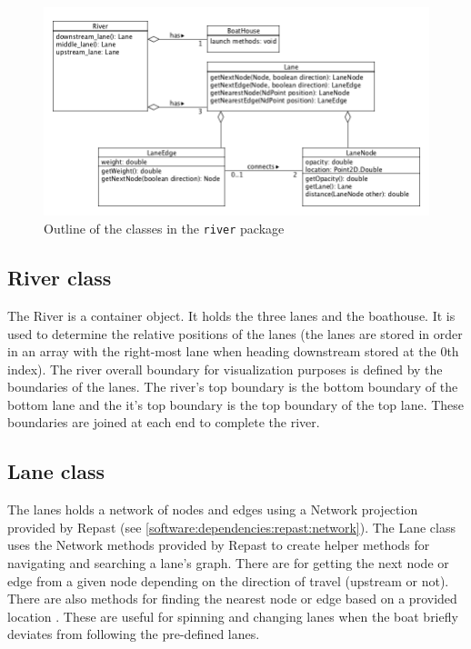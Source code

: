 \begin{figure}
\begin{center}
  \includegraphics[scale=0.3]{images/riverpackage.png}
  \caption{Outline of the classes in the \texttt{river} package}
  \label{software:fig:riverUML}
\end{center}
\end{figure}

\subsection{River class}
The River is a container object. It holds the three lanes and the
boathouse. It is used to determine the relative positions of the lanes
(the lanes are stored in order in an array with the right-most lane when
heading downstream stored at the 0th index). The river overall
boundary for visualization purposes is defined by the boundaries of
the lanes. The river's top boundary is the bottom boundary of
the bottom lane and the it's top boundary is the top boundary
of the top lane. These boundaries are joined at each end to
complete the river.

\subsection{Lane class}

The lanes holds a network of nodes and edges using a Network
projection provided by Repast (see
\ref{software:dependencies:repast:network}). The Lane class uses the
Network methods provided by Repast to create helper methods for
navigating and searching a lane's graph. There are for getting the
next node or edge from a given node depending on the direction of
travel (upstream or not). There are also methods for finding the
nearest node or edge based on a provided location . These are useful
for spinning and changing lanes when the boat briefly deviates from
following the pre-defined lanes.

